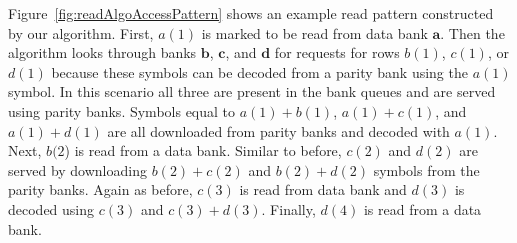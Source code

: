 Figure~\ref{fig:readAlgoAccessPattern} shows an example read pattern constructed by our algorithm. First, $a(1)$ is marked to be read from data bank $\mathbf{a}$. Then the algorithm looks through banks $\mathbf{b}$, $\mathbf{c}$, and $\mathbf{d}$ for requests for rows $b(1)$, $c(1)$, or $d(1)$ because these symbols can be decoded from a parity bank using the $a(1)$ symbol. In this scenario all three are present in the bank queues and are served using parity banks. Symbols equal to  $a(1) + b(1)$, $a(1) + c(1)$, and $a(1) + d(1)$ are all downloaded from parity banks and decoded with $a(1)$. Next, $b(2$) is read from a data bank. Similar to before, $c(2)$ and $d(2)$ are served by downloading $b(2) + c(2)$ and $b(2) + d(2)$ symbols from the parity banks. Again as before, $c(3)$ is read from data bank and $d(3)$ is decoded using $c(3)$ and $c(3) + d(3)$. Finally, $d(4)$ is read from a data bank.

